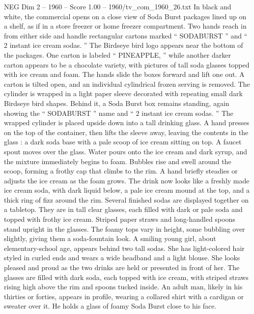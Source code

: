 \begin{textsample}{NEG Dim 2 – 1960 – Score 1.00 – 1960/tv\_com\_1960\_26.txt}  \label{ex:f2_neg_088}
In black and white, the commercial opens on a close view of Soda Burst packages lined up on a shelf, as if in a store freezer or home freezer compartment.
Two hands reach in from either side and handle rectangular cartons marked “ SODABURST ” and “ 2 instant ice cream sodas. ” The Birdseye bird logo appears near the bottom of the packages.
One carton is labeled “ PINEAPPLE, ” while another darker carton appears to be a chocolate variety, with pictures of tall soda glasses topped with ice cream and foam.
The hands slide the boxes forward and lift one out.
A carton is tilted open, and an individual cylindrical frozen serving is removed.
The cylinder is wrapped in a light paper sleeve decorated with repeating small dark Birdseye bird shapes.
Behind it, a Soda Burst box remains standing, again showing the “ SODABURST ” name and “ 2 instant ice cream sodas. ” The wrapped cylinder is placed upside down into a tall drinking glass.
A hand presses on the top of the container, then lifts the sleeve away, leaving the contents in the glass : a dark soda base with a pale scoop of ice cream sitting on top.
A faucet spout moves over the glass.
Water pours onto the ice cream and dark syrup, and the mixture immediately begins to foam.
Bubbles rise and swell around the scoop, forming a frothy cap that climbs to the rim.
A hand briefly steadies or adjusts the ice cream as the foam grows.
The drink now looks like a freshly made ice cream soda, with dark liquid below, a pale ice cream mound at the top, and a thick ring of fizz around the rim.
Several finished sodas are displayed together on a tabletop.
They are in tall clear glasses, each filled with dark or pale soda and topped with frothy ice cream.
Striped paper straws and long-handled spoons stand upright in the glasses.
The foamy tops vary in height, some bubbling over slightly, giving them a soda-fountain look.
A smiling young girl, about elementary-school age, appears behind two tall sodas.
She has light-colored hair styled in curled ends and wears a wide headband and a light blouse.
She looks pleased and proud as the two drinks are held or presented in front of her.
The glasses are filled with dark soda, each topped with ice cream, with striped straws rising high above the rim and spoons tucked inside.
An adult man, likely in his thirties or forties, appears in profile, wearing a collared shirt with a cardigan or sweater over it.
He holds a glass of foamy Soda Burst close to his face.

\end{textsample}
